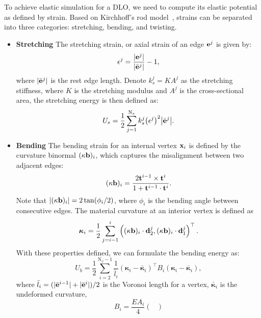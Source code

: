 To achieve elastic simulation for a DLO, we need to compute its elastic potential as defined by strain. Based on Kirchhoff’s rod model~\citep{dill1992kirchhoff,o2017kirchhoff}, strains can be separated into three categories: stretching, bending, and twisting.
\begin{itemize}[leftmargin=10pt]
    \item \textbf{Stretching} The stretching strain, or axial strain of an edge ${\mathbf{e}}^j$ is given by:
    \begin{equation}
        \epsilon^j=\frac{|{\mathbf{e}}^j|}{|\bar{{\mathbf{e}}}^j|}-1,
    \end{equation}
    where $|\bar{{\mathbf{e}}}^j|$ is the rest edge length. Denote $k_s^j=KA^j$ as the stretching stiffness, where $K$ is the stretching modulus and $A^j$ is the cross-sectional area, the stretching energy is then defined as:
    \begin{equation}
        U_s=\frac{1}{2}\sum_{j=1}^{\text{N}_e} k_s^j \big(\epsilon^j\big)^2\big|\bar{{\mathbf{e}}}^j\big|.
    \end{equation}
    \item \textbf{Bending} The bending strain for an internal vertex ${\mathbf{x}}_i$ is defined by the curvature binormal $(\kappa{\mathbf{b}})_i$, which captures the misalignment between two adjacent edges:
    \begin{equation}
        (\kappa{\mathbf{b}})_i=\frac{2{\mathbf{t}}^{i-1}\times {\mathbf{t}}^i}{1+{\mathbf{t}}^{i-1}\cdot {\mathbf{t}}^i}.
    \end{equation}
    Note that $|(\kappa{\mathbf{b}})_i| = 2\tan(\phi_i/2)$, where $\phi_i$ is the bending angle between consecutive edges. The material curvature at an interior vertex is defined as
    \begin{equation}
        \boldsymbol{\kappa}_i=\frac{1}{2}\sum_{j=i-1}^i\left((\kappa {\mathbf{b}})_i\cdot {\mathbf{d}}_2^j, (\kappa {\mathbf{b}})_i\cdot {\mathbf{d}}_1^j\right)^\top.
    \end{equation}
    With these properties defined, we can formulate the bending energy as:
    \begin{equation}
        U_b = \frac{1}{2}\sum_{i=2}^{\text{N}_v-1}\frac{1}{\bar{l}_i}(\boldsymbol{\kappa}_i-\bar{\boldsymbol{\kappa}}_i)^\top B_i (\boldsymbol{\kappa}_i-\bar{\boldsymbol{\kappa}}_i),
    \end{equation}
    where $\bar{l}_i=(|\bar{{\mathbf{e}}}^{i-1}|+|\bar{{\mathbf{e}}}^{i}|)/2$ is the Voronoi length for a vertex, $\boldsymbol{\bar{\kappa}}_i$ is the undeformed curvature,
    \begin{equation}
        B_i=\frac{EA_i}{4}
        \begin{pmatrix}

\end{pmatrix}
\end{equation}
\end{itemize}

